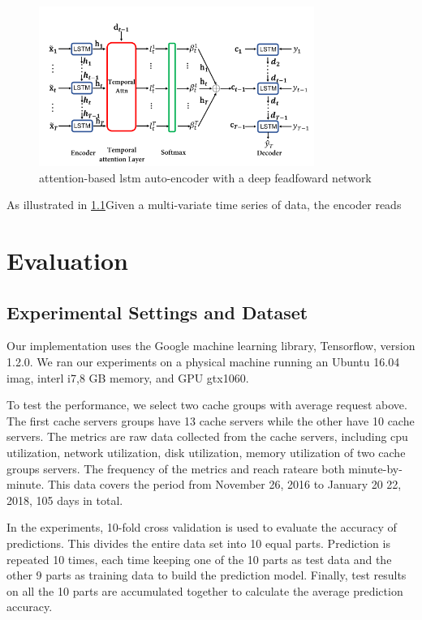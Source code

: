 \documentclass[5p]{elsarticle}
\newcommand{\dabiaolv}{reach rate}
\begin{document}
\begin{figure}[h]
    \centering
    \includegraphics[width=0.8\textwidth]{our_models.png}
    \caption{attention-based lstm auto-encoder with a deep feadfoward network}
    \label{fig:Prediction Results}
\end{figure}

As illustrated in \ref{}Given a multi-variate time series of data, the encoder reads 

\section{Evaluation}
\subsection{Experimental Settings and Dataset}
Our implementation uses the Google machine learning library, Tensorflow, version 1.2.0. We ran our experiments on a physical machine running an Ubuntu 16.04 imag, interl i7,8 GB memory, and GPU gtx1060.

To test the performance, we select two cache groups with average request above. The first cache servers groups have 13 cache servers while the other have 10 cache servers. The  metrics are raw data collected from the cache servers, including cpu utilization, network utilization, disk utilization, memory utilization of two cache groups servers. The frequency of the metrics and  \dabiaolv are both minute-by-minute. This data covers the period from November 26, 2016 to January 20 22, 2018, 105 days in total.

In the experiments, 10-fold cross validation is used to evaluate the accuracy of predictions. This divides the entire data set into 10 equal parts.  Prediction is repeated 10 times, each time keeping one of the 10 parts as test data and the other 9 parts as training data to build the prediction model. Finally, test results on all the 10 parts are accumulated together to calculate the average prediction accuracy.
\end{document}
